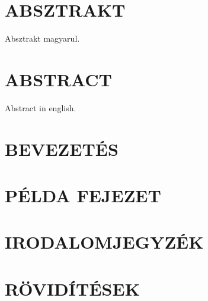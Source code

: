 

















\section*{ABSZTRAKT}
Absztrakt magyarul.

\newpage
\section*{ABSTRACT}
Abstract in english.



\newpage
{}
\tableofcontents
\newpage




\clearpage
\section{BEVEZETÉS}


\clearpage
\section{PÉLDA FEJEZET}













\clearpage
\section{IRODALOMJEGYZÉK}
\printbibliography[heading=none]

\clearpage
\renewcommand{\listfigurename}{ÁBRAJEGYZÉK}
\listoffigures

\clearpage
\renewcommand{\listtablename}{TÁBLAJEGYZÉK}
\listoftables

\clearpage
\section{RÖVIDÍTÉSEK}






